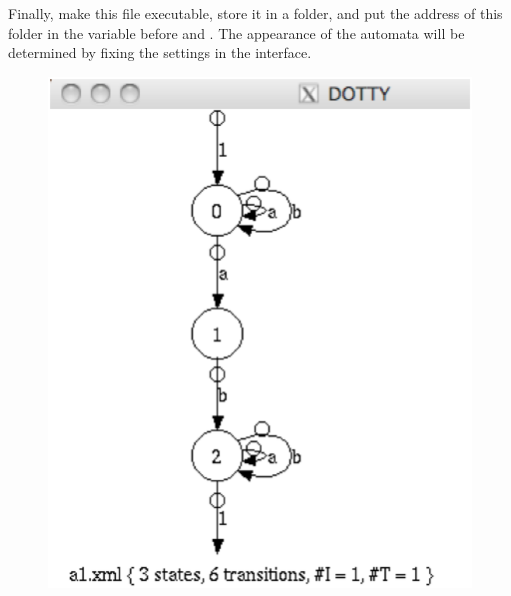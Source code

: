 Finally, make this file executable, store it in a folder, and put the 
address of this folder in the  variable before 
 and .
The appearance of the automata will be determined by fixing the 
settings in the interface.

\begin{figure}[ht]
    \centering
\includegraphics[scale=0.25]{figures/a1-dotty.ps}
\ee

\end{figure}
